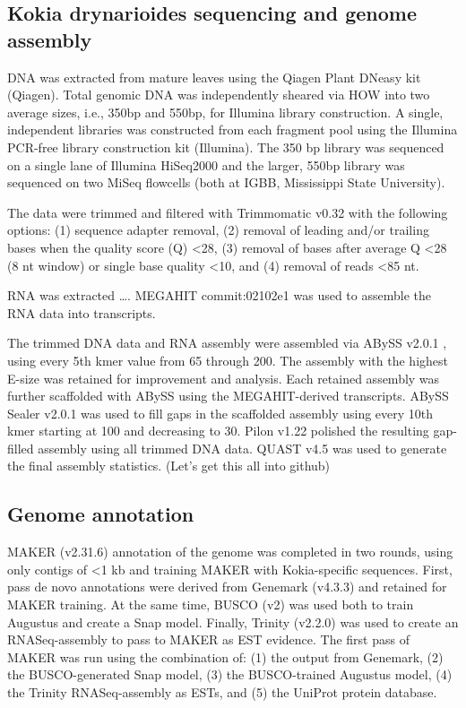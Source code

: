\documentclass[10pt,letterpaper]{article}
\newcommand{\note}[2][]{\added[id=#1,remark={#2}]{}}
\begin{document}
\subsection*{Kokia drynarioides sequencing and genome assembly}

DNA was extracted from mature leaves using the Qiagen Plant DNeasy kit (Qiagen).
Total genomic DNA was independently sheared via HOW into two average sizes,
i.e., 350bp and 550bp, for Illumina library construction. A single, independent
libraries was constructed from each fragment pool using the Illumina PCR-free
library construction kit (Illumina). The 350 bp library was sequenced on a
single lane of Illumina HiSeq2000 and the larger, 550bp library was sequenced on
two MiSeq flowcells (both at IGBB, Mississippi State University).

The data were trimmed and filtered with Trimmomatic v0.32 \cite{Bolger2014} with
the following options: (1) sequence adapter removal, (2) removal of leading
and/or trailing bases when the quality score (Q) \textless 28, (3) removal of
bases after average Q \textless 28 (8 nt window) or single base quality
\textless 10, and (4) removal of reads \textless 85 nt.

RNA was extracted \ldots. MEGAHIT commit:02102e1 \cite{Li2015} was used to assemble
the RNA data into transcripts.

The trimmed DNA data and RNA assembly were assembled via ABySS v2.0.1
\cite{Simpson2009}, using every 5th kmer value from 65 through 200. The assembly
with the highest E-size \cite{Salzberg2012} was retained for improvement and
analysis. Each retained assembly was further scaffolded with ABySS using the
MEGAHIT-derived transcripts. ABySS Sealer v2.0.1 \cite{Paulino2015} was used to
fill gaps in the scaffolded assembly using every 10th kmer starting at 100 and
decreasing to 30. Pilon v1.22 \cite{Walker2014} polished the resulting
gap-filled assembly using all trimmed DNA data. QUAST v4.5 \cite{Gurevich2013}
was used to generate the final assembly statistics. (Let's get this all into
github)


\subsection*{Genome annotation}

MAKER (v2.31.6)\cite{Holt2011} annotation of the genome was completed in two
rounds, using only contigs of \textless 1 kb and training MAKER with
Kokia-specific sequences. First, pass de novo annotations were derived from
Genemark (v4.3.3)\cite{Lomsadze2005} and retained for MAKER training. At the
same time, BUSCO (v2)\cite{Simao2015} was used both to train Augustus and create
a Snap model\note[Corrinne]{WHAT'S A SNAP MODEL}. Finally, Trinity
\note[Corrinne]{WHY TRINITY VS MEGAHIT} (v2.2.0)\cite{Grabherr2011} was used to
create an RNASeq-assembly to pass to MAKER as EST evidence. The first pass of
MAKER was run using the combination of: (1) the output from Genemark, (2) the
BUSCO-generated Snap model, (3) the BUSCO-trained Augustus\cite{Stanke2003}
model, (4) the Trinity RNASeq-assembly as ESTs, and (5) the UniProt protein
database.
\end{document}
